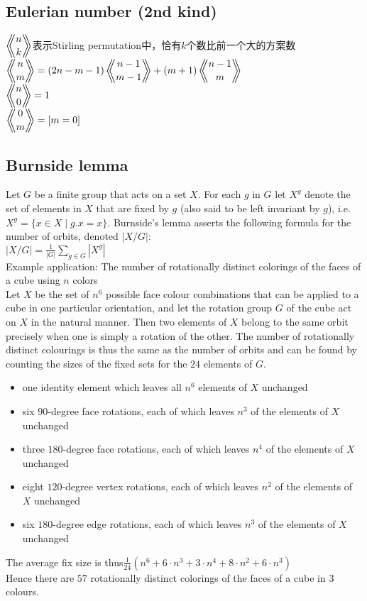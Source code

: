 	\subsection*{Eulerian number (2nd kind)}
		$ \Eularian{n}{k} $表示Stirling permutation中，恰有$ k $个数比前一个大的方案数
		\\$ \Eularian{n}{m} = (2n - m - 1) \Eularian{n - 1}{m - 1} + (m + 1) \Eularian{n - 1}{m} $
		\\$ \Eularian{n}{0} = 1 $
		\\$ \Eularian{0}{m} = [m = 0] $
	\subsection*{Burnside lemma}
		Let $ G $ be a finite group that acts on a set $ X $. For each $ g $ in $ G $ let $ X^g $ denote the set of elements in $ X $ that are fixed by $ g $ (also said to be left invariant by $ g $), i.e. $ X^g = \lbrace x \in X \mid g.x = x \rbrace $. Burnside's lemma asserts the following formula for the number of orbits, denoted $ \left| X / G \right| $:
		\\$ \left| X / G \right| = \frac{1}{\left| G \right|} \sum\limits_{g \in G}^{} \left| X^g \right| $
		\\Example application: The number of rotationally distinct colorings of the faces of a cube using $ n $ colors
		\\Let $ X $ be the set of $ n^6 $ possible face colour combinations that can be applied to a cube in one particular orientation, and let the rotation group $ G $ of the cube act on $ X $ in the natural manner. Then two elements of $ X $ belong to the same orbit precisely when one is simply a rotation of the other. The number of rotationally distinct colourings is thus the same as the number of orbits and can be found by counting the sizes of the fixed sets for the $ 24 $ elements of $ G $.
		\begin{itemize}[nosep,wide=0pt]
			\item one identity element which leaves all $ n^6 $ elements of $ X $ unchanged
			\item six $ 90 $-degree face rotations, each of which leaves $ n^3 $ of the elements of $ X $ unchanged
			\item three $ 180 $-degree face rotations, each of which leaves $ n^4 $ of the elements of $ X $ unchanged
			\item eight $ 120 $-degree vertex rotations, each of which leaves $ n^2 $ of the elements of $ X $ unchanged
			\item six $ 180 $-degree edge rotations, each of which leaves $ n^3 $ of the elements of $ X $ unchanged
		\end{itemize}
		The average fix size is thus$ \frac {1}{24}(n^6+6\cdot n^3+3\cdot n^4+8\cdot n^2+6\cdot n^3) $
		\\Hence there are $ 57 $ rotationally distinct colorings of the faces of a cube in $ 3 $ colours.
